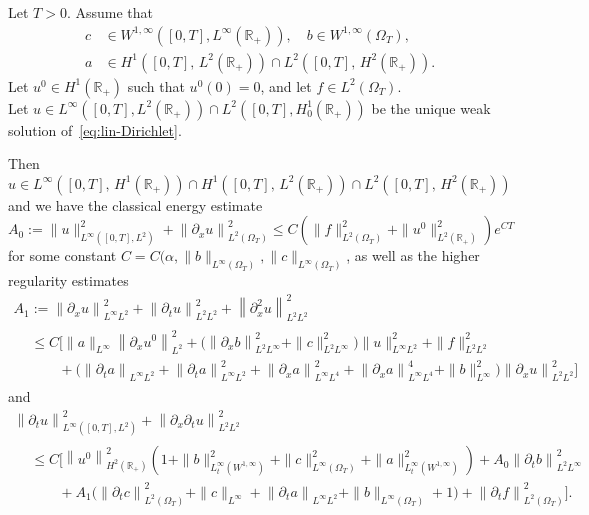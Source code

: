 \documentclass[10pt]{amsart}
\theoremstyle{definition}\newtheorem{defi}[theo]{Definition}\newtheorem{rema}[theo]{Remark}\newtheorem{exam}[theo]{Example}\newtheorem{exem}[theo]{Example}\newtheorem{nota}[theo]{Notation}
\newcommand{\R}{\mathbb{R}}
\newcommand{\p}{\partial}
\begin{document}
\begin{prop}\label{prop:est-gal}
Let $T>0$.
Assume that
\begin{align*}
c &\in W^{1,\infty}\left([0,T], L^\infty(\R_+)\right), \quad b\in W^{1,\infty}(\Omega_T), \\
a &\in H^1\left([0,T],\,L^2(\R_+)\right) \cap L^2\left([0,T],\, H^2(\R_+)\right).
\end{align*}
Let $u^0\in H^1(\R_+)$ such that $u^0(0)=0$, and let $f\in L^2(\Omega_T)$.\\
Let $u\in L^\infty([0,T], L^2(\R_+))\cap L^2([0,T], H^1_0(\R_+))$ be the unique weak solution of~\eqref{eq:lin-Dirichlet}.


Then $u \in L^\infty([0,T],\,H^1(\R_+)) \cap H^1([0,T],\, L^2(\R_+)) \cap L^2([0,T],\,H^2(\R_+))$ and we have the classical energy estimate
\begin{equation}\label{est:energy-gal-1}
A_0:=\| u\|_{L^\infty\left([0,T], L^2\right)}^2 + \left\| \p_x u\right\|_{L^2(\Omega_T)}^2
\leq C \left(\|f\|_{L^2(\Omega_T)}^2 + \| u^0\|_{L^2(\R_+)}^2\right)e^{CT}
\end{equation}
for some constant $C=C(\alpha, \|b\|_{L^\infty(\Omega_T)}, \|c\|_{L^\infty(\Omega_T)}$, as well as the higher regularity estimates
\begin{multline}\label{est:energy-gal-u_x}
A_1:= \left\|\partial_x u\right\|_{L^\infty L^2}^2 + \left\|\partial_t u\right\|_{L^2 L^2}^2 + \left\|\partial^2_x u\right\|_{L^2 L^2}^2  \\
\begin{aligned}
& \leq C \Bigg[
\|a\|_{L^\infty}\left\|\partial_x u^0\right\|_{L^2}^2 + \big(\left\|\partial_x b\right\|_{L^2 L^\infty}^2 + \|c\|_{L^2L^\infty}^2\big) \|u\|_{L^\infty L^2}^2 + \|f\|_{L^2 L^2}^2\\
& \qquad + \big(\left\|\partial_t a\right\|_{L^\infty L^2}+ \left\|\partial_t a\right\|_{L^\infty L^2}^2 + \left\|\partial_x a\right\|_{L^\infty L^4}^2 + \left\|\partial_x a\right\|_{L^\infty L^4}^4 + \|b\|_{L^\infty}^2 \big) \left\|\partial_x u\right\|_{L^2 L^2}^2
\Bigg]
\end{aligned}
\end{multline}
and
\begin{multline}\label{est:energy-gal-u_xx}
 \left\|\p_t u\right\|_{L^\infty\left([0,T], L^2\right)}^2 + \left\| \p_x\p_t u\right\|_{L^2L^2}^2 \\
\begin{aligned}
&\leq C\Big[\left\|u^0\right\|_{H^2(\R_+)}^2 \left(1 + \| b\|_{L^\infty_t\left(W^{1,\infty}\right)}^2 + \|c\|_{L^\infty(\Omega_T)}^2 + \| a\|_{L^\infty_t\left(W^{1,\infty}\right)}^2\right)+ A_0\left\|\partial_t b\right\|_{L^2 L^\infty}^2\\
&\qquad+ A_1\big(\left\|\partial_t c\right\|_{L^2(\Omega_T)}^2+ \|c\|_{L^\infty} + \left\|\partial_t a\right\|_{L^\infty L^2} + \|b\|_{L^\infty(\Omega_T)} +1\big) + \left\|\partial_t f\right\|_{L^2(\Omega_T)}^2 \Big].
\end{aligned}
\end{multline}
\end{prop}
\end{document}
